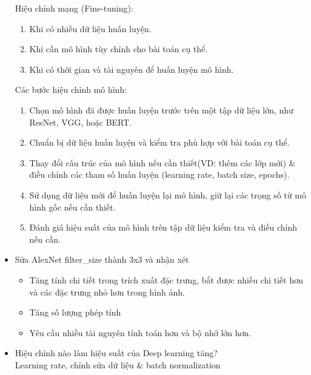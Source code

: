 \begin{itemize}
\begin{enumerate}
    \end{enumerate}
    Hiệu chỉnh mạng (Fine-tuning):
    \begin{enumerate}
        \item Khi có nhiều dữ liệu huấn luyện.
        \item Khi cần mô hình tùy chỉnh cho bài toán cụ thể.
        \item Khi có thời gian và tài nguyên để huấn luyện mô hình.
    \end{enumerate}
    Các bước hiệu chỉnh mô hình:
    \begin{enumerate}
        \item Chọn mô hình đã được huấn luyện trước trên một tập dữ liệu lớn, như ResNet, VGG, hoặc BERT.
        \item Chuẩn bị dữ liệu huấn luyện và kiểm tra phù hợp với bài toán cụ thể.
        \item Thay đổi cấu trúc của mô hình nếu cần thiết(VD: thêm các lớp mới) \& điều chỉnh các tham số huấn luyện (learning rate, batch size, epochs).
        \item Sử dụng dữ liệu mới để huấn luyện lại mô hình, giữ lại các trọng số từ mô hình gốc nếu cần thiết.
        \item Đánh giá hiệu suất của mô hình trên tập dữ liệu kiểm tra và điều chỉnh nếu cần.
    \end{enumerate}
    \item Sửa AlexNet filter\_size thành 3x3 và nhận xét
    \begin{itemize}
        \item Tăng tính chi tiết trong trích xuất đặc trưng, bắt được nhiều chi tiết hơn và các đặc trưng nhỏ hơn trong hình ảnh.
        \item Tăng số lượng phép tính
        \item Yêu cầu nhiều tài nguyên tính toán hơn và bộ nhớ lớn hơn.
    \end{itemize}
    \item Hiệu chỉnh nào làm hiệu suất của Deep learning tăng?\\
    Learning rate, chỉnh sửa dữ liệu \& batch normalization
\end{itemize}
